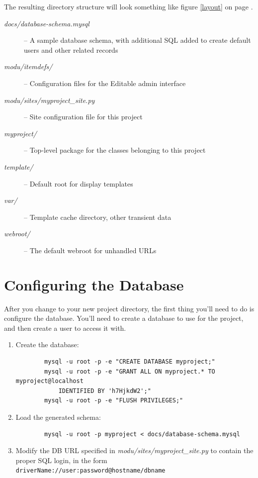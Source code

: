 The resulting directory structure will look something like
figure \ref{layout} on page \pageref{layout}.

\begin{flushleft}
\begin{description}
    \item[\emph{docs/database-schema.mysql}]
    -- A sample database schema, with additional SQL added to create default
    users and other related records
    \item[\emph{modu/itemdefs/}]
    -- Configuration files for the Editable admin interface
    \item[\emph{modu/sites/myproject\_site.py}]
    -- Site configuration file for this project
    \item[\emph{myproject/}]
    -- Top-level package for the classes belonging to this project
    \item[\emph{template/}]
    -- Default root for display templates
    \item[\emph{var/}]
    -- Template cache directory, other transient data
    \item[\emph{webroot/}]
    -- The default webroot for unhandled URLs
\end{description}
\end{flushleft}

\section{Configuring the Database}

After you change to your new project directory, the first thing you'll
need to do is configure the database. You'll need to create a database to
use for the project, and then create a user to access it with.

\begin{flushleft}
\begin{enumerate}
    \item Create the database:
        \begin{verbatim}
        mysql -u root -p -e "CREATE DATABASE myproject;"
        mysql -u root -p -e "GRANT ALL ON myproject.* TO myproject@localhost 
            IDENTIFIED BY 'h7HjkdW2';"
        mysql -u root -p -e "FLUSH PRIVILEGES;"
        \end{verbatim}
    \item Load the generated schema:
        \begin{verbatim}
        mysql -u root -p myproject < docs/database-schema.mysql
        \end{verbatim}
    \item Modify the DB URL specified in \emph{modu/sites/myproject\_site.py} to
        contain the proper SQL login, in the form \verb|driverName://user:password@hostname/dbname|
\end{enumerate}
\end{flushleft}

